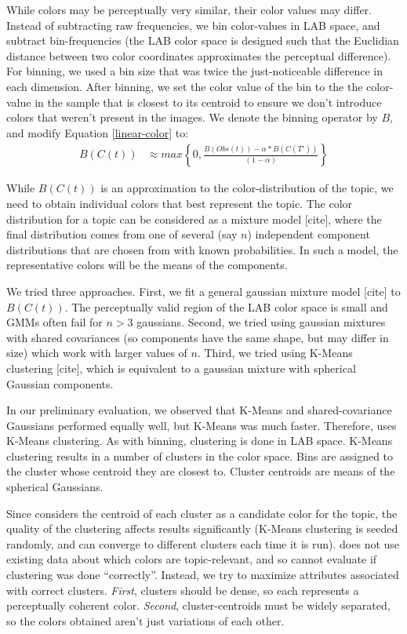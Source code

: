 While colors may be perceptually very similar, their color values may differ. Instead of subtracting raw frequencies, we bin color-values in LAB space, and subtract bin-frequencies (the LAB color space is designed such that the Euclidian distance between two color coordinates approximates the perceptual difference). For binning, we used a bin size that was twice the just-noticeable difference in each dimension. After binning, we set the color value of the bin to the the color-value in the sample that is closest to its centroid to ensure we don't introduce colors that weren't present in the images. We denote the binning operator by $B$, and modify Equation \ref{linear-color} to:
\begin{align}
\label{linear-color-bin}  
B(C(t)) &\approx max\left\{0,\frac{B(Obs(t)) - \alpha*B(C(T'))}{(1-\alpha)}\right\}
\end{align}

While $B(C(t))$ is an approximation to the color-distribution of the topic, we need to obtain individual colors that best represent the topic. The color distribution for a topic can be considered as a mixture model [cite], where the final distribution comes from one of several (say $n$) independent component distributions that are chosen from with known probabilities. In such a model, the representative colors will be the means of the components. 

We tried three approaches. First, we fit a general gaussian mixture model [cite] to $B(C(t))$. The perceptually valid region of the LAB color space is small and GMMs often fail for $n>3$ gaussians. Second, we tried using gaussian mixtures with shared covariances (so components have the same shape, but may differ in size) which work with larger values of $n$. Third, we tried using K-Means clustering [cite], which is equivalent to a gaussian mixture with spherical Gaussian components. 

In our preliminary evaluation, we observed that K-Means and shared-covariance Gaussians performed equally well, but K-Means was much faster. Therefore, \system uses K-Means clustering. As with binning, clustering is done in LAB space. K-Means clustering results in a number of clusters in the color space. Bins are assigned to the cluster whose centroid they are closest to. Cluster centroids are means of the spherical Gaussians.

Since \system considers the centroid of each cluster as a candidate color for the topic, the quality of the clustering affects results significantly (K-Means clustering is seeded randomly, and can converge to different clusters each time it is run). \system does not use existing data about which colors are topic-relevant, and so cannot evaluate if clustering was done ``correctly''. Instead, we try to maximize attributes associated with correct clusters. {\em First}, clusters should be dense, so each represents a perceptually coherent color. {\em Second}, cluster-centroids must be widely separated, so the colors obtained aren't just variations of each other. 

